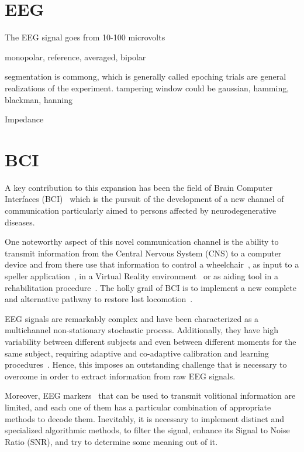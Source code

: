 \section{EEG}

The EEG signal goes from 10-100 microvolts

monopolar, reference, averaged, 
bipolar

segmentation is commong, which is generally called epoching
trials are general realizations of the experiment.
tampering window could be gaussian, hamming, blackman, hanning

Impedance

\section{BCI}

A key contribution to this expansion has been the field of Brain Computer Interfaces (BCI)~\cite{WolpawJonathanR2012} which is the pursuit of the development of a new channel of communication particularly aimed to persons affected by neurodegenerative diseases.

One noteworthy aspect of this novel communication channel is the ability to transmit information from the Central Nervous System (CNS) to a computer device and from there use that information to control a wheelchair~\cite{Carlson2013}, as input to a speller application~\cite{Guger2009a}, in a Virtual Reality environment~\cite{Lotte2013} or as aiding tool in a rehabilitation procedure~\cite{Jure2016}.  The holly grail of BCI is to implement a new complete and alternative pathway to restore lost locomotion~\cite{WolpawJonathanR2012}.

EEG signals are remarkably complex and have been characterized as a multichannel non-stationary stochastic process.  Additionally, they have high variability between different subjects and even between different moments for the same subject, requiring adaptive and co-adaptive calibration and learning procedures~\cite{Clerc}.  Hence, this imposes an outstanding challenge that is necessary to overcome in order to extract information from raw EEG signals.

Moreover, EEG markers~\cite{Clerc} that can be used to  transmit volitional information are limited, and each one of them has a particular combination of appropriate methods to decode them. Inevitably, it is necessary to implement  distinct and specialized algorithmic methods, to filter the signal, enhance its Signal to Noise Ratio (SNR), and try to determine some meaning out of it.  

